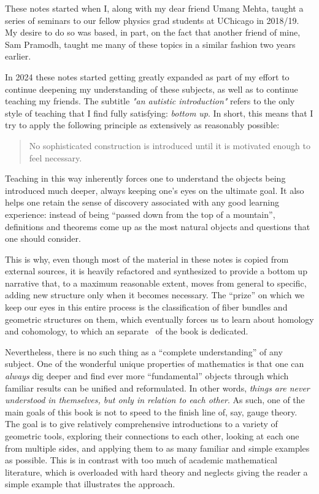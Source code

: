 
These notes started when I, along with my dear friend Umang Mehta, taught a series of seminars to our fellow physics grad students at UChicago in 2018/19. My desire to do so was based, in part, on the fact that another friend of mine, Sam Pramodh, taught me many of these topics in a similar fashion two years earlier.

In 2024 these notes started getting greatly expanded as part of my effort to continue deepening my understanding of these subjects, as well as to continue teaching my friends. The subtitle \emph{"an autistic introduction"} refers to the only style of teaching that I find fully satisfying: \emph{bottom up}. In short, this means that I try to apply the following principle as extensively as reasonably possible:
\begin{quote}
    No sophisticated construction is introduced until it is motivated enough to feel necessary.
\end{quote}
Teaching in this way inherently forces one to understand the objects being introduced much deeper, always keeping one's eyes on the ultimate goal. It also helps one retain the sense of discovery associated with any good learning experience: instead of being ``passed down from the top of a mountain'', definitions and theorems come up as the most natural objects and questions that one should consider. 

This is why, even though most of the material in these notes is copied from external sources, it is heavily refactored and synthesized to provide a bottom up narrative that, to a maximum reasonable extent, moves from general to specific, adding new structure only when it becomes necessary. The ``prize'' on which we keep our eyes in this entire process is the classification of fiber bundles and geometric structures on them, which eventually forces us to learn about homology and cohomology, to which an separate \partt\ of the book is dedicated. 

Nevertheless, there is no such thing as a ``complete understanding'' of any subject. One of the wonderful unique properties of mathematics is that one can \emph{always} dig deeper and find ever more ``fundamental'' objects through which familiar results can be unified and reformulated. In other words, \emph{things are never understood in themselves, but only in relation to each other}. As such, one of the main goals of this book is not to speed to the finish line of, say, gauge theory. The goal is to give relatively comprehensive introductions to a variety of geometric tools, exploring their connections to each other, looking at each one from multiple sides, and applying them to as many familiar and simple examples as possible. This is in contrast with too much of academic mathematical literature, which is overloaded with hard theory and neglects giving the reader a simple example that illustrates the approach.

